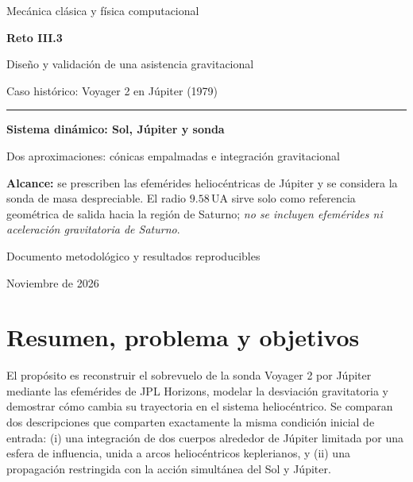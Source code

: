 \documentclass[11pt,a4paper]{article}
\begin{document}
\begin{titlepage}
\centering
\vspace*{2cm}
{\Large Mecánica clásica y física computacional\par}
\vspace{1.2cm}
{\Huge\bfseries Reto III.3\par}
\vspace{.5cm}
{\LARGE Diseño y validación de una asistencia gravitacional\par}
\vspace{.65cm}
{\Large Caso histórico: Voyager 2 en Júpiter (1979)\par}
\vspace{1.1cm}
\rule{.8\textwidth}{.6pt}\par
\vspace{.5cm}
{\large\bfseries Sistema dinámico: Sol, Júpiter y sonda\par}
{\normalsize Dos aproximaciones: cónicas empalmadas e integración gravitacional\par}
\vspace{1.4cm}
\begin{minipage}{.83\textwidth}
\textbf{Alcance:} se prescriben las efemérides heliocéntricas de Júpiter y se considera la sonda de masa despreciable. El radio $9.58\,\mathrm{UA}$ sirve solo como referencia geométrica de salida hacia la región de Saturno; \emph{no se incluyen efemérides ni aceleración gravitatoria de Saturno}.
\end{minipage}
\vfill
{\large Documento metodológico y resultados reproducibles\par}
{\large Noviembre de 2026\par}
\end{titlepage}
\tableofcontents
\newpage

\section{Resumen, problema y objetivos}
El propósito es reconstruir el sobrevuelo de la sonda Voyager 2 por Júpiter mediante las efemérides de JPL Horizons, modelar la desviación gravitatoria y demostrar cómo cambia su trayectoria en el sistema heliocéntrico. Se comparan dos descripciones que comparten exactamente la misma condición inicial de entrada: (i) una integración de dos cuerpos alrededor de Júpiter limitada por una esfera de influencia, unida a arcos heliocéntricos keplerianos, y (ii) una propagación restringida con la acción simultánea del Sol y Júpiter.
\end{document}
